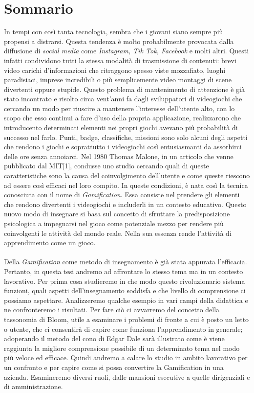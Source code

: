 \chapter*{Sommario}
\label{sommario}


In tempi con così tanta tecnologia, sembra che i giovani siano sempre più propensi a distrarsi. Questa tendenza è molto probabilmente provocata dalla diffusione di \textit{social media} come \textit{Instagram, Tik Tok, Facebook} e molti altri. Questi infatti condividono tutti la stessa modalità di trasmissione di contenuti: brevi video carichi d'informazioni che ritraggono spesso viste mozzafiato, luoghi paradisiaci, imprese incredibili o più semplicemente video montaggi di scene divertenti oppure stupide.
Questo problema di mantenimento di attenzione è già stato incontrato e risolto circa vent'anni fa dagli sviluppatori di videogiochi che cercando un modo per riuscire a mantenere l'interesse dell'utente alto, con lo scopo che esso continui a fare d'uso della propria applicazione, realizzarono che introducento determinati elementi nei propri giochi avevano più probabilità di successo nel farlo. Punti, badge, classifiche, missioni sono solo alcuni degli aspetti che rendono i giochi e soprattutto i videogiochi così entusiasmanti da assorbirci delle ore senza annoiarci.
Nel 1980 Thomas Malone, in un articolo che venne pubblicato dal MIT[1], condusse uno studio cercando quali di queste caratteristiche sono la causa del coinvolgimento dell'utente e come queste riescono ad essere così efficaci nel loro compito. In queste condizioni, è nata così la tecnica conosciuta con il nome di \textit{Gamification}. Essa consiste nel prendere gli elementi che rendono divertenti i videogiochi e includerli in un contesto educativo. Questo nuovo modo di insegnare si basa sul concetto di sfruttare la predisposizione psicologica a impegnarsi nel gioco come potenziale mezzo per rendere più coinvolgenti le attività del mondo reale. Nella sua essenza rende l'attività di apprendimento come un gioco.
\\
\\
Della \textit{Gamification} come metodo di insegnamento è già stata appurata l'efficacia. Pertanto, in questa tesi andremo ad affrontare lo stesso tema ma in un contesto lavorativo. Per prima cosa studieremo in che modo questo rivoluzionario sistema funzioni, quali aspetti dell'insegnamento soddisfa e che livello di comprensione ci possiamo aspettare. Analizzeremo qualche esempio in vari campi della didattica e ne confronteremo i risultati. Per fare ciò ci avvarremo del concetto della tassonomia di Bloom, utile a esaminare i problemi di fronte a cui è posto un letto o utente, che ci consentirà di capire come funziona l'apprendimento in generale; adoperando il metodo del cono di Edgar Dale sarà illustrato come è viene raggiunta la migliore comprensione possibile di un determinato tema nel modo più veloce ed efficace. Quindi andremo a calare lo studio in ambito lavorativo per un confronto e per capire come si possa convertire la Gamification in una azienda. Esamineremo diversi ruoli, dalle mansioni esecutive a quelle dirigenziali e di amministrazione.
